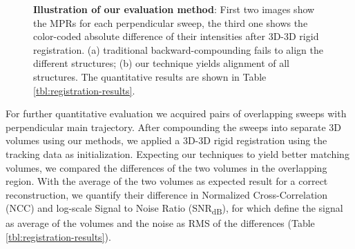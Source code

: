 \begin{figure}[ht]
	\centering
	\caption{
		\textbf{Illustration of our evaluation method}: First two images show the MPRs for each perpendicular sweep, the third one shows the color-coded absolute difference of their intensities after 3D-3D rigid registration.
		(a) traditional backward-compounding \cite{Wein06} fails to align the different structures; 
		(b) our technique yields alignment of all structures.
		The quantitative results are shown in Table \ref{tbl:registration-results}.
	}
	\label{fig:uscompounding:comparison-msd}
\end{figure}

For further quantitative evaluation we acquired pairs of overlapping sweeps with perpendicular main trajectory.
After compounding the sweeps into separate 3D volumes using our methods, we applied a 3D-3D rigid registration using the tracking data as initialization.
Expecting our techniques to yield better matching volumes, we compared the differences of the two volumes in the overlapping region.
With the average of the two volumes as expected result for a correct reconstruction, we quantify their difference in Normalized Cross-Correlation (NCC) and log-scale Signal to Noise Ratio (SNR\textsubscript{dB}), for which define the signal as average of the volumes and the noise as RMS of the differences (Table \ref{tbl:registration-results}).

